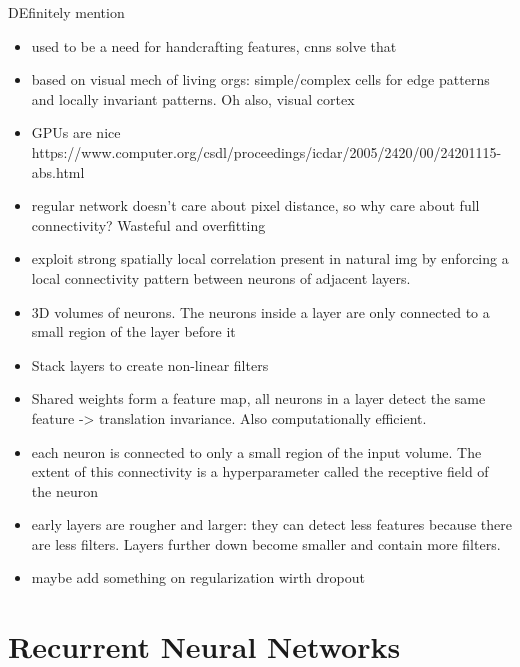 DEfinitely mention
\begin{itemize}
  \item used to be a need for handcrafting features, cnns solve that
  \item based on visual mech of living orgs: simple/complex cells for
    edge patterns and locally invariant patterns.
    Oh also, visual cortex
  \item GPUs are nice https://www.computer.org/csdl/proceedings/icdar/2005/2420/00/24201115-abs.html
  \item regular network doesn't care about pixel distance,
    so why care about full connectivity? Wasteful and overfitting
  \item exploit strong spatially local correlation present in natural img
by enforcing a local connectivity pattern between neurons of adjacent layers.
  \item 3D volumes of neurons.  The neurons inside a layer are only connected to a small region of the layer before it
  \item Stack layers to create non-linear filters
  \item Shared weights form a feature map,
    all neurons in a layer detect the same feature -> translation invariance.
    Also computationally efficient.
  \item each neuron is connected to only a small region of the input volume. The extent of this connectivity is a hyperparameter called the receptive field of the neuron
  \item early layers are rougher and larger:
    they can detect less features because there are less filters.
    Layers further down become smaller and contain more filters.
  \item maybe add something on regularization wirth dropout


\end{itemize}


\section{Recurrent Neural Networks}
